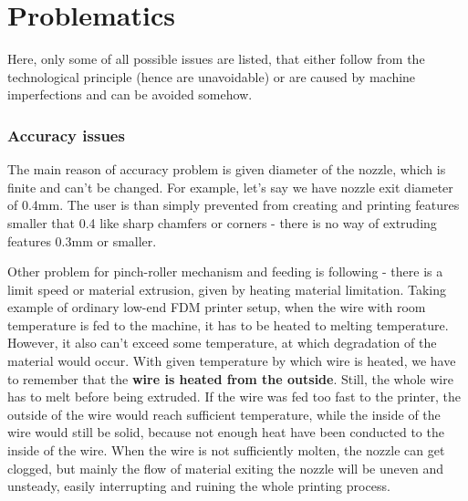 \documentclass[a4paper, twoside, 11pt]{report}
\begin{document}
\section{Problematics}
Here, only some of all possible issues are listed, that either follow from the technological principle (hence are unavoidable) or are caused by machine imperfections and can be avoided somehow.
\subsubsection{Accuracy issues}
The main reason of accuracy problem is given diameter of the nozzle, which is finite and can't be changed. For example, let's say we have nozzle exit diameter of 0.4mm. The user is than simply prevented from creating and printing features smaller that 0.4 like sharp chamfers or corners - there is no way of extruding features 0.3mm or smaller.

	Other problem for pinch-roller mechanism and feeding is following - there is a limit speed or material extrusion, given by heating material limitation. Taking example of ordinary low-end FDM printer setup, when the wire with room temperature is fed to the machine, it has to be heated to melting temperature. However, it  also can't exceed some temperature, at which degradation of the material would occur. With given temperature by which wire is heated, we have to remember that the \textbf{wire is heated from the outside}. Still, the whole wire has to melt before being extruded. If the wire was fed too fast to the printer, the outside of the wire would reach sufficient temperature, while the inside of the wire would still be solid, because not enough heat have been conducted to the inside of the wire. When the wire is not sufficiently molten, the nozzle can get clogged, but mainly the flow of material exiting the nozzle will be uneven and unsteady, easily interrupting and ruining the whole printing process.
	
\end{document}
